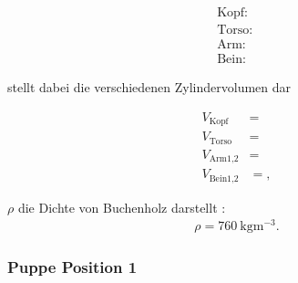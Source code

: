 \begin{subequations}
\begin{align}
\text{Kopf: }\label{eq:21a}\\
\text{Torso: }\label{eq:21b}\\
\text{Arm: }\label{eq:21c}\\
\text{Bein: }\label{eq:21d}
\end{align}
\end{subequations}

\justifying stellt dabei die verschiedenen Zylindervolumen dar

\begin{subequations}
\begin{align}
 V_{\text{Kopf}} &= \label{eq:22a}\\
 V_{\text{Torso}} &= \label{eq:22b}\\
 V_{\text{Arm1,2}} &= \label{eq:22c}\\
 V_{\text{Bein1,2}} &= \label{eq:22d},
\end{align}
\end{subequations}

\justifying $\rho$ die Dichte von Buchenholz darstellt \cite{Holzdichte}:
\begin{align}
    \rho = \SI{760}{\kilo\gram\meter\tothe{-3}}\label{eq:23}.
\end{align}

\subsubsection{Puppe Position 1}\label{sec:Puppe1} %

